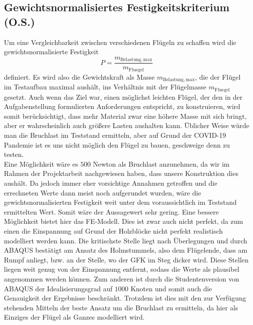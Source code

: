\subsection{Gewichtsnormalisiertes Festigkeitskriterium (O.S.)}
Um eine Vergleichbarkeit zwischen verschiedenen Flügeln zu schaffen wird die gewichtsnormalisierte Festigkeit
\begin{equation}
\label{GewichtF}
	P=\frac{m_{\mathrm{Belastung,max}}}{m_{\mathrm{Fluegel}}}
\end{equation}
definiert. Es wird also die Gewichtskraft als Masse $m_{\mathrm{Belastung,max}}$, die der Flügel im Testaufbau maximal aushält, ins Verhältnis mit der Flügelmasse $m_{\mathrm{Fluegel}}$ gesetzt. Auch wenn das Ziel war, einen möglichst leichten Flügel, der den in der Aufgabenstellung formulierten Anforderungen entspricht, zu konstruieren, wird somit berücksichtigt, dass mehr Material zwar eine höhere Masse mit sich bringt, aber er wahrscheinlich auch größere Lasten aushalten kann. Üblicher Weise würde man die Bruchlast im Teststand ermitteln, aber auf Grund der COVID-19 Pandemie ist es uns nicht möglich den Flügel zu bauen, geschweige denn zu testen.\\
	
\noindent Eine Möglichkeit wäre es $500$ Newton als Bruchlast anzunehmen, da wir im Rahmen der Projektarbeit nachgewiesen haben, dass unsere Konstruktion dies aushält. Da jedoch immer eher vorsichtige Annahmen getroffen und die errechneten Werte dann meist noch aufgerundet wurden, wäre die gewichtsnormalisierten Festigkeit weit unter dem voraussichtlich im Teststand ermittelten Wert. Somit wäre der Aussagewert sehr gering.
Eine bessere Möglichkeit bietet hier das FE-Modell. Dies ist zwar auch nicht perfekt, da zum einen die Einspannung auf Grund der Holzblöcke nicht perfekt realistisch modelliert werden kann. Die kritischste Stelle liegt nach Überlegungen und durch ABAQUS bestätigt am Ansatz des Holmstummels, also dem Flügelende, dass am Rumpf anliegt, bzw. an der Stelle, wo der GFK im Steg dicker wird. Diese Stellen liegen weit genug von der Einspannung entfernt, sodass die Werte als plausibel angenommen werden können. Zum anderen ist durch die Studentenversion von ABAQUS der Idealisierungsgrad auf $1000$ Knoten und somit auch die Genauigkeit der Ergebnisse beschränkt. Trotzdem ist dies mit den zur Verfügung stehenden Mitteln der beste Ansatz um die Bruchlast zu ermitteln, da hier als Einziges der Flügel als Ganzes modelliert wird.\\

